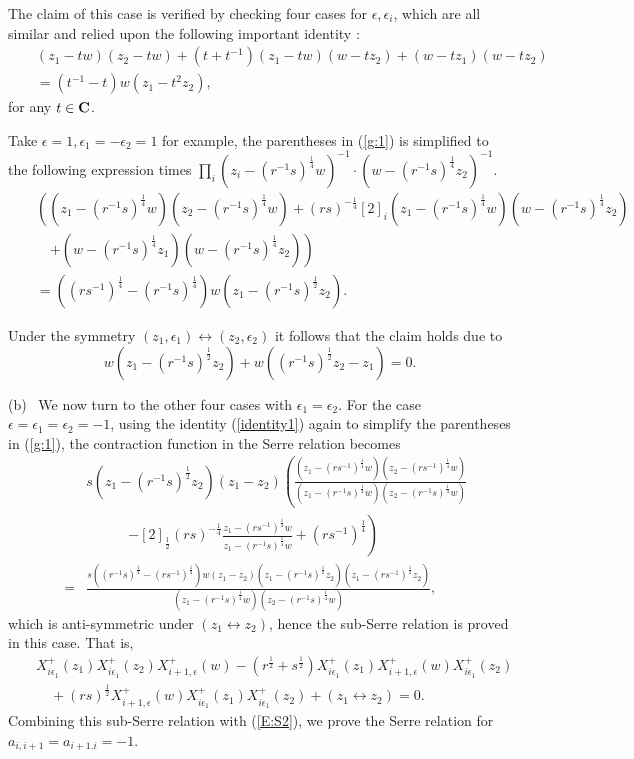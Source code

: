 \documentclass{amsproc}
\theoremstyle{remark}
\numberwithin{equation}{section}
\begin{document}
The claim of this case is verified by checking four cases for ${\epsilon}, {\epsilon}_i$, which
are all similar and relied upon the following important identity
\cite{JKM1}:
\begin{eqnarray} \label{identity1}
&&(z_1-tw)(z_2-tw)
+(t+t^{-1})(z_1-tw)
(w-tz_2)
+(w-tz_1)
(w-tz_2)\\
&&=(t^{-1}-t)w(z_1-t^{2}z_2),\nonumber
\end{eqnarray}
for any  $t\in {\bf C}$.

Take ${\epsilon}=1, {\epsilon}_1=-{\epsilon}_2=1$ for example, the parentheses in (\ref{g:1})
is simplified to the following expression times
$\prod_i(z_i-(r^{-1}s)^{\frac{1}{4}}w)^{-1} \cdot
(w-(r^{-1}s)^{\frac{1}{4}}z_2)^{-1}$.
\begin{eqnarray*}
&&\left((z_1-(r^{-1}s)^{\frac{1}{4}}w)(z_2-(r^{-1}s)^{\frac{1}{4}}w)+(rs)^{-\frac{1}{4}}[2]_i
(z_1-(r^{-1}s)^{\frac{1}{4}}w)(w-(r^{-1}s)^{\frac{1}{4}}z_2)
\right.
\\
&&\quad \left. +(w-(r^{-1}s)^{\frac{1}{4}}z_1)(w-(r^{-1}s)^{\frac{1}{4}}z_2)\right)\\
&&=((rs^{-1})^{\frac{1}{4}}-(r^{-1}s)^{\frac{1}{4}})w(z_1-(r^{-1}s)^{\frac{1}{2}}z_2).
\end{eqnarray*}

Under the symmetry $(z_1, {\epsilon}_1)\leftrightarrow (z_2, {\epsilon}_2)$ it
follows that the claim holds due to
$$w(z_1-(r^{-1}s)^{\frac{1}{2}}z_2)+w((r^{-1}s)^{\frac{1}{2}}z_2-z_1)=0.$$

(b) \ We now turn to the other four cases with ${\epsilon}_1={\epsilon}_2$. For the case ${\epsilon}={\epsilon}_1={\epsilon}_2=-1$, using
the identity (\ref{identity1}) again to simplify the parentheses in
(\ref{g:1}), the contraction function in the Serre relation becomes
\begin{eqnarray*}
&&s(z_1-(r^{-1}s)^{\frac{1}{2}}z_2)(z_1-z_2)
\left(\frac{(z_1-(rs^{-1})^{\frac{1}{4}}w)(z_2-(rs^{-1})^{\frac{1}{4}}w)}
{(z_1-(r^{-1}s)^{\frac{1}{4}}w)(z_2-(r^{-1}s)^{\frac{1}{4}}w)}
\right.\\
&&\qquad\quad \left.-[2]_{\frac{1}{2}}(rs)^{-\frac{1}{4}}
\frac{z_1-(rs^{-1})^{\frac{1}{4}}w}{z_1-(r^{-1}s)^{\frac{1}{4}}w}+(rs^{-1})^{\frac{1}{4}}\right)\\
&=& \frac{s((r^{-1}s)^{\frac{1}{4}}-(rs^{-1})^{\frac{1}{4}})w
(z_1-z_2)(z_1-(r^{-1}s)^{\frac{1}{2}}z_2)(z_1-(rs^{-1})^{\frac{1}{2}}z_2)}
{(z_1-(r^{-1}s)^{\frac{1}{4}}w)(z_2-(r^{-1}s)^{\frac{1}{4}}w)},
\end{eqnarray*}
which is anti-symmetric under $(z_1\leftrightarrow z_2)$, hence the
sub-Serre relation is proved in this case. That is,
\begin{eqnarray*}
&&X_{i{\epsilon}_1}^+(z_1)X_{i{\epsilon}_1}^+(z_2)X^+_{i+1,{\epsilon}}(w)-(r^{\frac{1}{2}}+s^{\frac{1}{2}})
X_{i{\epsilon}_1}^+(z_1)X^+_{i+1,{\epsilon}}(w)X_{i{\epsilon}_1}^+(z_2)\\
&&\quad
+(rs)^{\frac{1}{2}}X^+_{i+1,{\epsilon}}(w)X_{i{\epsilon}_1}^+(z_1)X_{i{\epsilon}_1}^+(z_2)
+(z_1\leftrightarrow z_2)=0.
\end{eqnarray*}
Combining this sub-Serre relation with (\ref{E:S2}), we prove the
Serre relation for $a_{i, i+1}=a_{i+1. i}=-1$.
\end{document}
